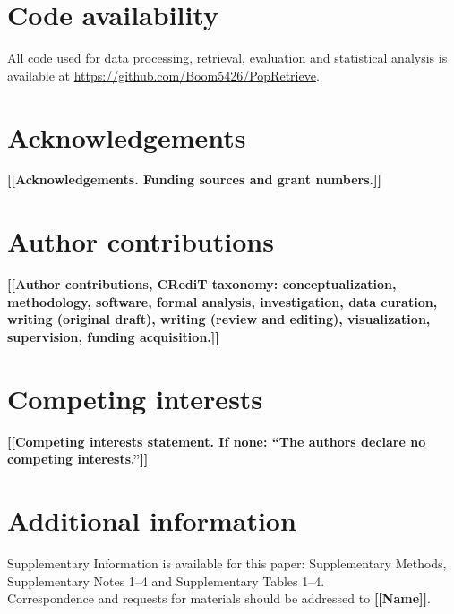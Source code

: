 \documentclass[11pt,letterpaper]{article}
\newcommand{\TODO}[1]{{\color{BrickRed}\textbf{[[#1]]}}}
\begin{document}
\section*{Code availability}

All code used for data processing, retrieval, evaluation and statistical analysis is
available at \url{https://github.com/Boom5426/PopRetrieve}. 

\section*{Acknowledgements}
\TODO{Acknowledgements. Funding sources and grant numbers.}

\section*{Author contributions}
\TODO{Author contributions, CRediT taxonomy: conceptualization, methodology, software,
formal analysis, investigation, data curation, writing (original draft), writing (review and
editing), visualization, supervision, funding acquisition.}

\section*{Competing interests}
\TODO{Competing interests statement. If none: ``The authors declare no competing interests.''}

\section*{Additional information}
\noindent Supplementary Information is available for this paper: Supplementary Methods, Supplementary Notes 1--4 and
Supplementary Tables 1--4.\\
Correspondence and requests for materials should be addressed to \TODO{Name}.



\end{document}
